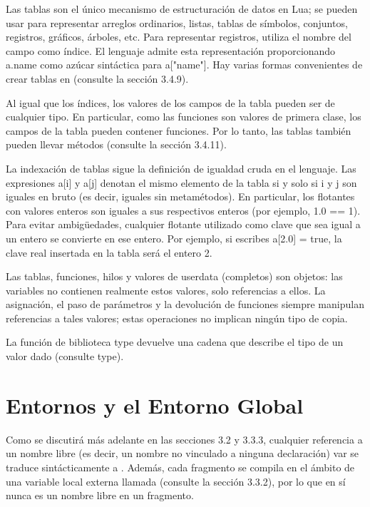 Las tablas son el único mecanismo de estructuración de datos en Lua; se pueden usar para representar arreglos ordinarios, listas, tablas de símbolos, conjuntos, registros, gráficos, árboles, etc. Para representar registros,  utiliza el nombre del campo como índice. El lenguaje admite esta representación proporcionando a.name como azúcar sintáctica para a["name"]. Hay varias formas convenientes de crear tablas en  (consulte la sección 3.4.9).

Al igual que los índices, los valores de los campos de la tabla pueden ser de cualquier tipo. En particular, como las funciones son valores de primera clase, los campos de la tabla pueden contener funciones. Por lo tanto, las tablas también pueden llevar métodos (consulte la sección 3.4.11).

La indexación de tablas sigue la definición de igualdad cruda en el lenguaje. Las expresiones a[i] y a[j] denotan el mismo elemento de la tabla si y solo si i y j son iguales en bruto (es decir, iguales sin metamétodos). En particular, los flotantes con valores enteros son iguales a sus respectivos enteros (por ejemplo, 1.0 == 1). Para evitar ambigüedades, cualquier flotante utilizado como clave que sea igual a un entero se convierte en ese entero. Por ejemplo, si escribes a[2.0] = true, la clave real insertada en la tabla será el entero 2.

Las tablas, funciones, hilos y valores de userdata (completos) son objetos: las variables no contienen realmente estos valores, solo referencias a ellos. La asignación, el paso de parámetros y la devolución de funciones siempre manipulan referencias a tales valores; estas operaciones no implican ningún tipo de copia.

La función de biblioteca type devuelve una cadena que describe el tipo de un valor dado (consulte type).

\section{Entornos y el Entorno Global}

Como se discutirá más adelante en las secciones 3.2 y 3.3.3, cualquier referencia a un nombre libre (es decir, un nombre no vinculado a ninguna declaración) var se traduce sintácticamente a . Además, cada fragmento se compila en el ámbito de una variable local externa llamada  (consulte la sección 3.3.2), por lo que  en sí nunca es un nombre libre en un fragmento.

